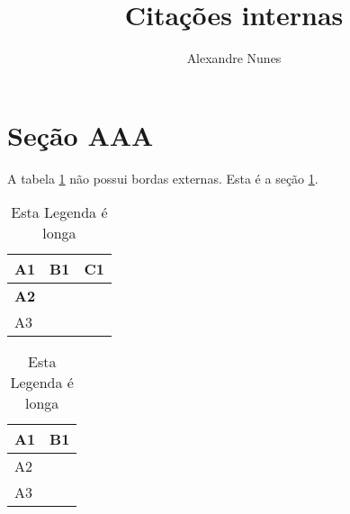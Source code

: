\documentclass{article}
\begin{document}
	
	\title{\textbf{{\Huge Citações internas}}} %
	\author{Alexandre Nunes} %
	\date{} %
	\maketitle %
	\thispagestyle{empty} %
	\newpage
	
	\setcounter{page}{1} %
	\tableofcontents %
	\newpage
	
	\listoffigures %
	\newpage
	
	\listoftables %
	\newpage

	\setcounter{page}{1} %
	
	
	\section{Seção AAA}
	\label{sec:secAAA}
	A tabela \ref{tab:tab_sem_borda} não possui bordas externas. Esta é a seção \ref{sec:secAAA}.

	
	\begin{table}[H]
		\centering
		\caption[Legenda Curta]{Esta Legenda é longa}
		\label{tab:tab_sem_borda}
		\begin{tabular}{l|l|l}
			{\LARGE \textbf{A1}} & \textbf{B1} & \textbf{C1} \\ \hline
			\textbf{A2}          &             &             \\ \hline
			A3          &             &             \\
		\end{tabular}
	\end{table}

	\renewcommand{\arraystretch}{1.5}
	\begin{table}[H]
		\centering
		\caption[Legenda Curta]{Esta Legenda é longa}
		\label{tab:tab_com_borda}
		\begin{tabular}{|l|l|l|}
			\hline
			\textbf{A1} & \multicolumn{2}{l|}{\textbf{B1}} \\ \hline
			A2          &                 &                \\ \hline
			A3          &                 &                \\ \hline
		\end{tabular}
	\end{table}
	
\end{document}
